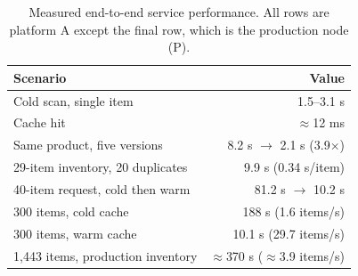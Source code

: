 \begin{table}[htbp]
\centering
\caption{Measured end-to-end service performance. All rows are platform A except the final row, which is the production node (P).}
\label{tab:throughput}
\footnotesize
\begin{tabular}{l r}
\hline
Scenario & Value \\
\hline
Cold scan, single item & 1.5--3.1 s \\
Cache hit & $\approx$12 ms \\
Same product, five versions & 8.2 s $\rightarrow$ 2.1 s (3.9$\times$) \\
29-item inventory, 20 duplicates & 9.9 s (0.34 s/item) \\
40-item request, cold then warm & 81.2 s $\rightarrow$ 10.2 s \\
300 items, cold cache & 188 s (1.6 items/s) \\
300 items, warm cache & 10.1 s (29.7 items/s) \\
1,443 items, production inventory & $\approx$370 s ($\approx$3.9 items/s) \\
\hline
\end{tabular}
\end{table}
